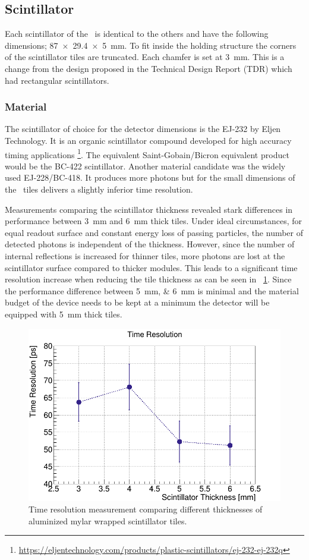 \documentclass[../BTOF_summary.tex]{subfiles}
\begin{document}
\subsection{Scintillator}
Each scintillator of the \btofD\ is identical to the others and have the following dimensions; \SI{87 x 29.4 x 5}{mm}.
To fit inside the holding structure the corners of the scintillator tiles are truncated.
Each chamfer is set at \SI{3}{mm}.
This is a change from the design proposed in the Technical Design Report (TDR) which had rectangular scintillators.

\subsubsection*{Material}
The scintillator of choice for the detector dimensions is the EJ-232 by Eljen Technology. It is an organic scintillator compound developed for high accuracy timing applications \footnote{\url{https://eljentechnology.com/products/plastic-scintillators/ej-232-ej-232q}}.
The equivalent Saint-Gobain/Bicron equivalent product would be the BC-422 scintillator.
Another material candidate was the widely used EJ-228/BC-418.
It produces more photons but for the small dimensions of the \btof\ tiles delivers a slightly inferior time resolution.

Measurements comparing the scintillator thickness revealed stark differences in performance between \SI{3}{mm} and \SI{6}{mm} thick tiles. 
Under ideal circumstances, for equal readout surface and constant energy loss of passing particles, the number of detected photons is independent of the thickness.
However, since the number of internal reflections is increased for thinner tiles, more photons are lost at the scintillator surface compared to thicker modules.
This leads to a significant time resolution increase when reducing the tile thickness as can be seen in \fig ~\ref{fig:Tchickness_timeRes}.
Since the performance difference between \SIlist[]{5;6}{mm} is minimal and the material budget of the device needs to be kept at a minimum the detector will be equipped with \SI{5}{mm} thick tiles.

\begin{figure}[htbp]
	\centering
	\includegraphics[width=.7\textwidth]{fig/TimeResSummary.png}
	\caption{Time resolution measurement comparing different thicknesses of aluminized mylar wrapped scintillator tiles.}
	\label{fig:Tchickness_timeRes}
\end{figure}
\end{document}
